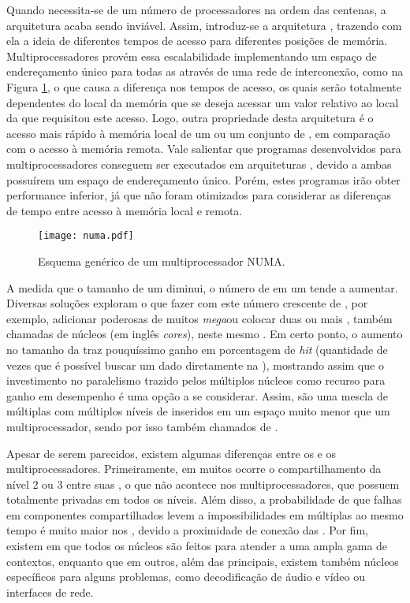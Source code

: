 Quando necessita-se de um número de processadores na ordem das centenas, a arquitetura \UMA acaba sendo inviável. Assim, introduz-se a arquitetura \NUMA, trazendo com ela a ideia de diferentes tempos de acesso para diferentes posições de memória. Multiprocessadores \NUMA provém essa escalabilidade implementando um espaço de endereçamento único para todas as \CPUs através de uma rede de interconexão, como na Figura \ref{fig:multiprocessadornuma}, o que causa a diferença nos tempos de acesso, os quais serão totalmente dependentes do local da memória que se deseja acessar um valor relativo ao local da \CPU que requisitou este acesso. Logo, outra propriedade desta arquitetura é o acesso mais rápido à memória local de um ou um conjunto de \CPUs, em comparação com o acesso à memória remota. Vale salientar que programas desenvolvidos para multiprocessadores \UMA conseguem ser executados em arquiteturas \NUMA, devido a ambas possuírem um espaço de endereçamento único. Porém, estes programas irão obter performance inferior, já que não foram otimizados para considerar as diferenças de tempo entre acesso à memória local e remota.

\begin{figure}[tb]
  \centering
  \caption{Esquema genérico de um multiprocessador NUMA.}
  \label{fig:multiprocessadornuma}
  \texttt{[image: numa.pdf]}
\end{figure}

A medida que o tamanho de um \transistor diminui, o número de \transistors em um \chip tende a aumentar. Diversas soluções exploram o que fazer com este número crescente de \transistors, por exemplo, adicionar \caches poderosas de muitos \textit{mega}\bytes ou colocar duas ou mais \CPUs, também chamadas de núcleos (em inglês \textit{cores}), neste mesmo \chip. Em certo ponto, o aumento no tamanho da \cache traz pouquíssimo ganho em porcentagem de \textit{hit} (quantidade de vezes que é possível buscar um dado diretamente na \cache), mostrando assim que o investimento no paralelismo trazido pelos múltiplos núcleos como recurso para ganho em desempenho é uma opção a se considerar. Assim, \chips \multicore são uma mescla de múltiplas \CPUs com múltiplos níveis de \cache inseridos em um espaço muito menor que um multiprocessador, sendo por isso também chamados de \CMPs.

Apesar de serem parecidos, existem algumas diferenças entre os \CMPs e os multiprocessadores. Primeiramente, em muitos \CMPs ocorre o compartilhamento da \cache nível 2 ou 3 entre suas \CPUs, o que não acontece nos multiprocessadores, que possuem \caches totalmente privadas em todos os níveis. Além disso, a probabilidade de que falhas em componentes compartilhados levem a impossibilidades em múltiplas \CPUs ao mesmo tempo é muito maior nos \CMPs, devido a proximidade de conexão das \CPUs. Por fim, existem \chips \multicore em que todos os núcleos são feitos para atender a uma ampla gama de contextos, enquanto que em outros, além das \CPUs principais, existem também núcleos específicos para alguns problemas, como decodificação de áudio e vídeo ou interfaces de rede. 

